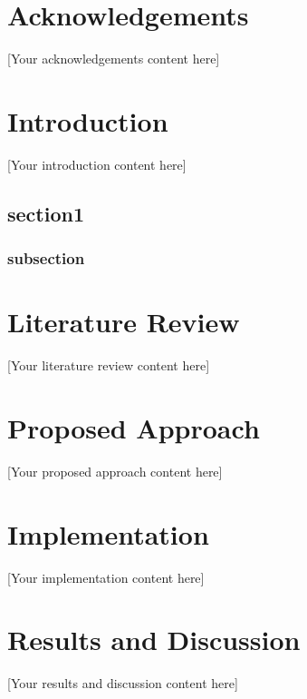 \documentclass[12pt,a4paper]{report}
\begin{document}
\chapter*{Acknowledgements}
[Your acknowledgements content here]
\clearpage



\tableofcontents
\listoffigures
\clearpage




\chapter{Introduction}
[Your introduction content here]


\section{section1}
\subsection{subsection}


\chapter{Literature Review}
[Your literature review content here]





\chapter{Proposed Approach}
[Your proposed approach content here]




\chapter{Implementation}
[Your implementation content here]




\chapter{Results and Discussion}
[Your results and discussion content here]
\end{document}
